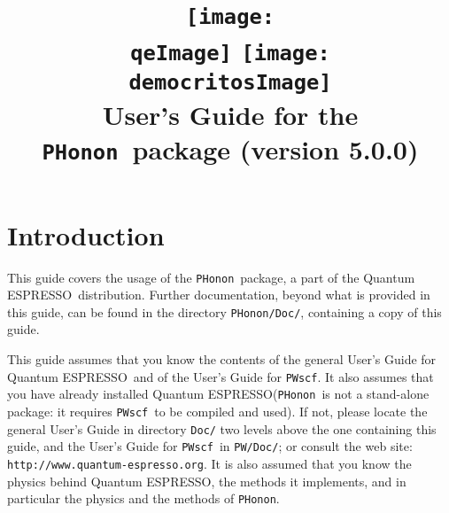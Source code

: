 \documentclass[12pt,a4paper]{article}
\def\version{5.0.0}
\def\qe{{\sc Quantum ESPRESSO}}
\def\PWscf{\texttt{PWscf}}
\def\PHonon{\texttt{PHonon}}
\begin{document}
 
\author{}
\date{}

\def\qeImage{../../Doc/quantum_espresso.pdf}
\def\democritosImage{../../Doc/democritos.pdf}


\title{
  \texttt{[image: \\qeImage]} \hskip 2cm
  \texttt{[image: \\democritosImage]}\\
  \vskip 1cm
  \Huge User's Guide for the \PHonon\ package \smallskip
  \Large (version \version)
}


\maketitle

\tableofcontents

\section{Introduction}

This guide covers the usage of the \PHonon\ package, a
part of the \qe\ distribution. 
Further documentation, beyond what is provided 
in this guide, can be found in the directory
\texttt{PHonon/Doc/}, containing a copy of this guide.

This guide assumes that you know the contents of 
the general User's Guide for \qe\ and of the User's 
Guide for \PWscf. It also assumes that you have
already installed \qe (\PHonon\ is not a stand-alone
package: it requires \PWscf\ to be compiled and used).
If not, please locate the general User's Guide in directory 
\texttt{Doc/} two levels above the one containing this guide,
and the User's Guide for \PWscf\ in \texttt{PW/Doc/};
or consult the web site:\\
\texttt{http://www.quantum-espresso.org}.
It is also assumed that you know the physics behind \qe,
the methods it implements, and in particular the physics
and the methods of \PHonon.

\end{document}
